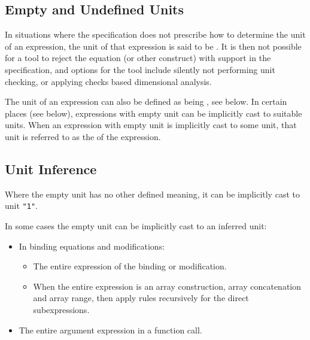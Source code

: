 \subsection{Empty and Undefined Units}\label{empty-and-undefined-units}

In situations where the specification does not prescribe how to determine the unit of an expression, the unit of that expression is said to be .
It is then not possible for a tool to reject the equation (or other construct) with support in the specification, and options for the tool include silently not performing unit checking, or applying checks based dimensional analysis.

The unit of an expression can also be defined as being , see below.
In certain places (see below), expressions with empty unit can be implicitly cast to suitable units.
When an expression with empty unit is implicitly cast to some unit, that unit is referred to as the  of the expression.


\subsection{Unit Inference}\label{unit-inference}

Where the empty unit has no other defined meaning, it can be implicitly cast to unit \lstinline!"1"!.

In some cases the empty unit can be implicitly cast to an inferred unit:
\begin{itemize}
\item
  In binding equations and modifications:
  \begin{itemize}
  \item The entire expression of the binding or modification.
  \item When the entire expression is an array construction, array concatenation and array range, then apply rules recursively for the direct subexpressions.
  \end{itemize}
\item
  The entire argument expression in a function call.
\end{itemize}


